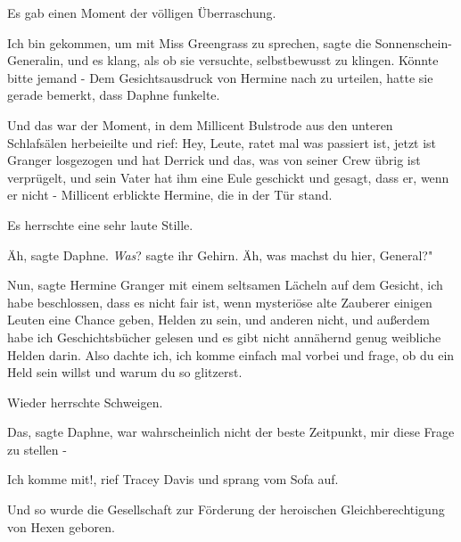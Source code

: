 Es gab einen Moment der völligen Überraschung.

\glqq{}Ich bin gekommen, um mit Miss Greengrass zu sprechen\grqq{}, sagte die
Sonnenschein-Generalin, und es klang, als ob sie versuchte, selbstbewusst zu
klingen. \glqq{}Könnte bitte jemand -\grqq{} Dem Gesichtsausdruck von Hermine
nach zu urteilen, hatte sie gerade bemerkt, dass Daphne funkelte.

Und das war der Moment, in dem Millicent Bulstrode aus den unteren Schlafsälen
herbeieilte und rief: \glqq{}Hey, Leute, ratet mal was passiert ist, jetzt ist
Granger losgezogen und hat Derrick und das, was von seiner Crew übrig ist
verprügelt, und sein Vater hat ihm eine Eule geschickt und gesagt, dass er, wenn
er nicht -\grqq{} Millicent erblickte Hermine, die in der Tür stand.

Es herrschte eine sehr laute Stille.

\glqq{}Äh\grqq{}, sagte Daphne. \emph{Was}? sagte ihr Gehirn. \glqq{}Äh, was
machst du hier, General?"

\glqq{}Nun\grqq{}, sagte Hermine Granger mit einem seltsamen Lächeln auf dem
Gesicht, \glqq{}ich habe beschlossen, dass es nicht fair ist, wenn mysteriöse
alte Zauberer einigen Leuten eine Chance geben, Helden zu sein, und anderen
nicht, und außerdem habe ich Geschichtsbücher gelesen und es gibt nicht
annähernd genug weibliche Helden darin. Also dachte ich, ich komme einfach mal
vorbei und frage, ob du ein Held sein willst und warum du so glitzerst.\grqq{}

Wieder herrschte Schweigen.

\glqq{}Das\grqq{}, sagte Daphne, \glqq{}war wahrscheinlich nicht der beste
Zeitpunkt, mir diese Frage zu stellen -\grqq{}

\glqq{}Ich komme mit!\grqq{}, rief Tracey Davis und sprang vom Sofa auf.

Und so wurde die Gesellschaft zur Förderung der heroischen Gleichberechtigung
von Hexen geboren.

